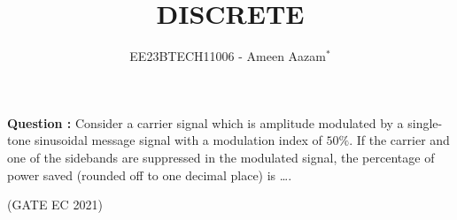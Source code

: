 \documentclass[journal,12pt,twocolumn]{IEEEtran}
\theoremstyle{remark}
\begin{document}

\vspace{3cm}

\title{DISCRETE}
\author{EE23BTECH11006 - Ameen Aazam$^{*}$%
}
\maketitle
\newpage
\bigskip

\renewcommand{\thefigure}{\theenumi}
\renewcommand{\thetable}{\theenumi}

\vspace{3cm}
\textbf{Question :}
Consider a carrier signal which is amplitude modulated by a single-tone sinusoidal message signal with a modulation index of $50\%$. If the carrier and one of the sidebands are suppressed in the modulated signal, the percentage of power saved (rounded off to one decimal place) is \ldots.

\hfill(GATE EC 2021)
\end{document}
